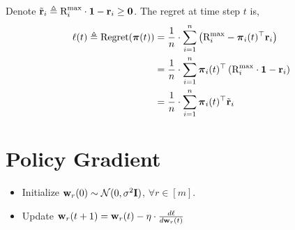 \documentclass[10pt]{article}
\begin{document}
Denote ${\tilde{\mathbf{r}}}_{i} \triangleq {\text{R}}_i^{\max} \cdot {\mathbf{1}} -  {\mathbf{r}}_{i} \ge {\mathbf{0}}$. The regret at time step $t$ is,
\begin{equation*}
\begin{split}
	\ell(t) \triangleq {\text{Regret}}({\boldsymbol{\pi}}(t)) &= \frac{1}{n} \cdot \sum\limits_{i=1}^{n}{ \left( {\text{R}}_i^{\max} - {\boldsymbol{\pi}}_{i}(t)^\top {\mathbf{r}}_i \right) } \\
	&= \frac{1}{n} \cdot \sum\limits_{i=1}^{n}{ {\boldsymbol{\pi}}_{i}(t)^\top \left( {\text{R}}_i^{\max} \cdot {\mathbf{1}} - {\mathbf{r}}_{i} \right) } \\
	&= \frac{1}{n} \cdot \sum\limits_{i=1}^{n}{ {\boldsymbol{\pi}}_{i}(t)^\top {\tilde{\mathbf{r}}}_{i} }
\end{split}
\end{equation*}

\section{Policy Gradient}

\begin{itemize}
	\item Initialize ${\mathbf{w}}_r(0) \sim {\mathcal{N}}(0, \sigma^2 {\mathbf{I}})$, $\forall r \in [m]$.
	\item Update ${\mathbf{w}}_r(t+1) = {\mathbf{w}}_r(t) - \eta \cdot \frac{d\ell}{d {\mathbf{w}}_r(t)}$
\end{itemize}
\end{document}
